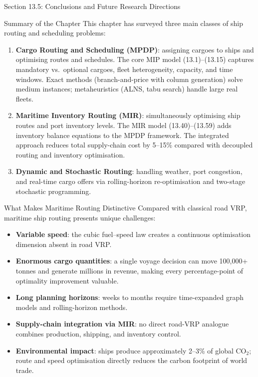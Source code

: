 \documentclass[aspectratio=169,10pt]{beamer}
\begin{document}
\begin{frame}[allowframebreaks]{Section 13.5: Conclusions and Future Research Directions}
  \begin{block}{Summary of the Chapter}
    This chapter has surveyed three main classes of ship routing and
    scheduling problems:
    \begin{enumerate}
      \item \textbf{Cargo Routing and Scheduling (MPDP)}: assigning cargoes
            to ships and optimising routes and schedules.  The core MIP model
            (13.1)--(13.15) captures mandatory vs.\ optional cargoes,
            fleet heterogeneity, capacity, and time windows.  Exact methods
            (branch-and-price with column generation) solve medium instances;
            metaheuristics (ALNS, tabu search) handle large real fleets.
      \item \textbf{Maritime Inventory Routing (MIR)}: simultaneously
            optimising ship routes and port inventory levels.  The MIR model
            (13.40)--(13.59) adds inventory balance equations to the MPDP
            framework.  The integrated approach reduces total supply-chain
            cost by 5--15\% compared with decoupled routing and inventory
            optimisation.
      \item \textbf{Dynamic and Stochastic Routing}: handling weather,
            port congestion, and real-time cargo offers via rolling-horizon
            re-optimisation and two-stage stochastic programming.
    \end{enumerate}
  \end{block}

  \begin{block}{What Makes Maritime Routing Distinctive}
    Compared with classical road VRP, maritime ship routing presents unique
    challenges:
    \begin{itemize}
      \item \textbf{Variable speed}: the cubic fuel--speed law creates a
            continuous optimisation dimension absent in road VRP.
      \item \textbf{Enormous cargo quantities}: a single voyage decision
            can move 100{,}000+ tonnes and generate millions in revenue,
            making every percentage-point of optimality improvement valuable.
      \item \textbf{Long planning horizons}: weeks to months require
            time-expanded graph models and rolling-horizon methods.
      \item \textbf{Supply-chain integration via MIR}: no direct road-VRP
            analogue combines production, shipping, and inventory control.
      \item \textbf{Environmental impact}: ships produce approximately 2--3\%
            of global CO$_2$; route and speed optimisation directly reduces
            the carbon footprint of world trade.
    \end{itemize}
  \end{block}


\end{frame}
\end{document}
